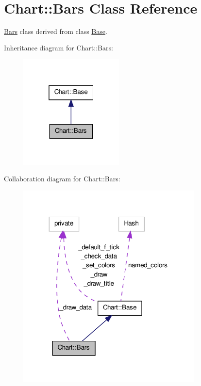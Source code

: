 \hypertarget{classChart_1_1Bars}{
\section{Chart::Bars Class Reference}
\label{classChart_1_1Bars}
}


\hyperlink{classChart_1_1Bars}{Bars} class derived from class \hyperlink{classChart_1_1Base}{Base}.  




Inheritance diagram for Chart::Bars:\nopagebreak
\begin{figure}[H]
\begin{center}
\leavevmode
\includegraphics[width=148pt]{classChart_1_1Bars__inherit__graph}
\end{center}
\end{figure}


Collaboration diagram for Chart::Bars:\nopagebreak
\begin{figure}[H]
\begin{center}
\leavevmode
\includegraphics[width=263pt]{classChart_1_1Bars__coll__graph}
\end{center}
\end{figure}
